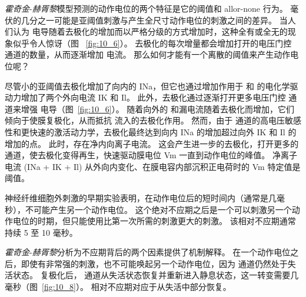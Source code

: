 \textit{霍奇金}-\textit{赫胥黎}模型预测的动作电位的两个特征是它的阈值和 allor-none 行为。
毫伏的几分之一可能是亚阈值刺激与产生全尺寸动作电位的刺激之间的差异。
当人们认为  电导随着去极化的增加而以严格分级的方式增加时，这种全有或全无的现象似乎令人惊讶（图 ~\ref{fig:10_6}）。 
去极化的每次增量都会增加打开的电压门控  通道的数量，从而逐渐增加  电流。
那么如何才能有一个离散的阈值来产生动作电位呢？


尽管小的亚阈值去极化增加了向内的 INa，但它也通过增加作用于  和  的电化学驱动力增加了两个外向电流 IK 和 Il。
此外，去极化通过逐渐打开更多电压门控  通道来增强  电导（图~\ref{fig:10_6}）。 
随着向外的  和漏电流随着去极化而增加，它们倾向于使膜复极化，从而抵抗  流入的去极化作用。
然而，由于  通道的高电压敏感性和更快速的激活动力学，去极化最终达到向内 INa 的增加超过向外 IK 和 Il 的增加的点。
此时，存在净内向离子电流。
这会产生进一步的去极化，打开更多的  通道，使去极化变得再生，快速驱动膜电位 Vm 一直到动作电位的峰值。
净离子电流 (INa + IK + Il) 从外向内变化、在膜电容内部沉积正电荷时的 Vm 特定值是阈值。


神经纤维细胞外刺激的早期实验表明，在动作电位后的短时间内（通常是几毫秒），不可能产生另一个动作电位。 
这个绝对不应期之后是一个可以刺激另一个动作电位的时期，但只能使用比第一次所需的刺激更大的刺激。 
该相对不应期通常持续 5 至 10 毫秒。


\textit{霍奇金}-\textit{赫胥黎}分析为不应期背后的两个因素提供了机制解释。
在一个动作电位之后，即使有非常强的刺激，也不可能唤起另一个动作电位，因为  通道仍然处于失活状态。 
复极化后， 通道从失活状态恢复并重新进入静息状态，这一转变需要几毫秒（图~\ref{fig:10_8}）。 
相对不应期对应于从失活中部分恢复。



